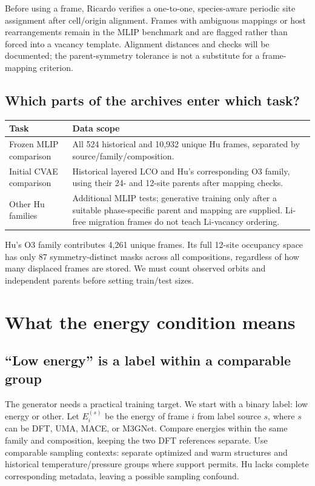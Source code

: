 Before using a frame, Ricardo verifies a one-to-one, species-aware periodic site assignment after cell/origin alignment. Frames with ambiguous mappings or host rearrangements remain in the MLIP benchmark and are flagged rather than forced into a vacancy template. Alignment distances and checks will be documented; the parent-symmetry tolerance is not a substitute for a frame-mapping criterion.

\subsection*{Which parts of the archives enter which task?}
\begin{tabularx}{\linewidth}{@{}p{3.2cm}Y@{}}
\toprule
Task & Data scope\\
\midrule
Frozen MLIP comparison & All 524 historical and 10,932 unique Hu frames, separated by source/family/composition.\\
Initial CVAE comparison & Historical layered LCO and Hu's corresponding O3 family, using their 24- and 12-site parents after mapping checks.\\
Other Hu families & Additional MLIP tests; generative training only after a suitable phase-specific parent and mapping are supplied. Li-free migration frames do not teach Li-vacancy ordering.\\
\bottomrule
\end{tabularx}

Hu's O3 family contributes 4,261 unique frames. Its full 12-site occupancy space has only 87 symmetry-distinct masks across all compositions, regardless of how many displaced frames are stored. We must count observed orbits and independent parents before setting train/test sizes.


\clearpage
\section{What the energy condition means}\label{sec:labels}

\subsection*{``Low energy'' is a label within a comparable group}
The generator needs a practical training target. We start with a binary label: low energy or other. Let $E_i^{(s)}$ be the energy of frame $i$ from label source $s$, where $s$ can be DFT, UMA, MACE, or M3GNet. Compare energies within the same family and composition, keeping the two DFT references separate. Use comparable sampling contexts: separate optimized and warm structures and historical temperature/pressure groups where support permits. Hu lacks complete corresponding metadata, leaving a possible sampling confound.

